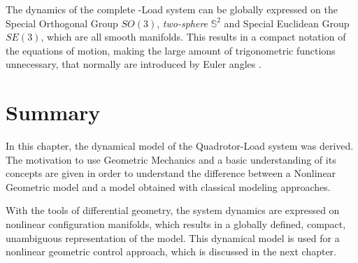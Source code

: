 The dynamics of the complete -Load system can be globally expressed on the Special Orthogonal Group $SO(3)$, \textit{two-sphere} $ \mathbb{S}^2 $ and Special Euclidean Group $ SE(3) $, which are all smooth  manifolds. This results in a compact notation of the equations of motion, making the large amount of trigonometric functions unnecessary, that normally are introduced by Euler angles . \\


\section*{Summary}
In this chapter, the dynamical model of the Quadrotor-Load system was derived.
The motivation to use Geometric Mechanics and a basic understanding of its concepts are given in order to understand the difference between a Nonlinear Geometric model and a model obtained with classical modeling approaches.

With the tools of differential geometry, the system dynamics are expressed on nonlinear configuration manifolds, which results in a globally defined, compact, unambiguous representation of the model. This dynamical model is used for a nonlinear geometric control approach, which is discussed in the next chapter.
